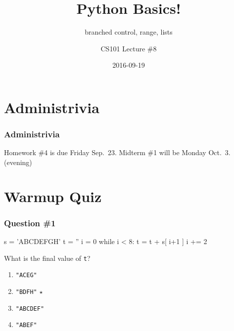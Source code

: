 \documentclass[11pt]{beamer}
\title{Python Basics!}
\subtitle{branched control, range, lists}
\author{CS101 Lecture \#8}
\date{2016-09-19}
\begin{document}
  \setcounter{showProgressBar}{0}
  \setcounter{showSlideNumbers}{0}

\frame{\titlepage}

\setcounter{framenumber}{0}
\setcounter{showProgressBar}{1}
\setcounter{showSlideNumbers}{1}

\section{Administrivia}

\begin{frame}
  \frametitle{Administrivia}
  \Enlarge
  \begin{itemize}
  \myitem  Homework \#4 is due Friday Sep.\ 23.
  \myitem  Midterm \#1 will be Monday Oct.\ 3.  (evening)
  \end{itemize}
\end{frame}

\section{Warmup Quiz}

\begin{frame}[fragile]
  \frametitle{Question \#1}
  \Enlarge

  \begin{semiverbatim}
s = 'ABCDEFGH'
t = ''
i = 0
while i < 8:
    t = t + s[ i+1 ]
    i += 2
  \end{semiverbatim}
  What is the final value of \texttt{t}?
  \begin{enumerate}[label=\Alph*]
  \item  \texttt{"ACEG"}
  \item  \texttt{"BDFH"}  $\star$
  \item  \texttt{"ABCDEF"}
  \item  \texttt{"ABEF"}
  \end{enumerate}
\end{frame}
\end{document}
